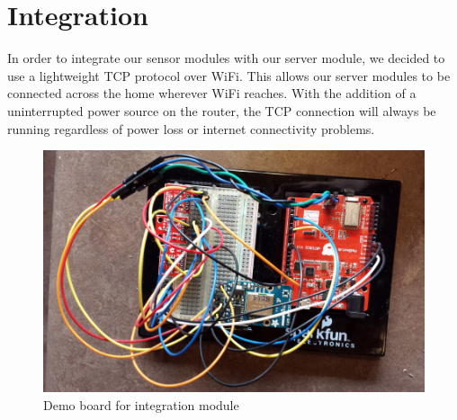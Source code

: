 \documentclass[10pt,twocolumn]{article}
\begin{document}
\section*{Integration}
 In order to integrate our sensor modules with our server module, we decided to use a lightweight TCP protocol over WiFi. This allows our server modules to be connected across the home wherever WiFi reaches. With the addition of a uninterrupted power source on the router, the TCP connection will always be running regardless of power loss or internet connectivity problems.
 \begin{figure}[h]
  \centering
    \includegraphics[scale=0.3]{integ.png}
  \caption{Demo board for integration module}
  \label{fig:integ}
\end{figure}
\end{document}

